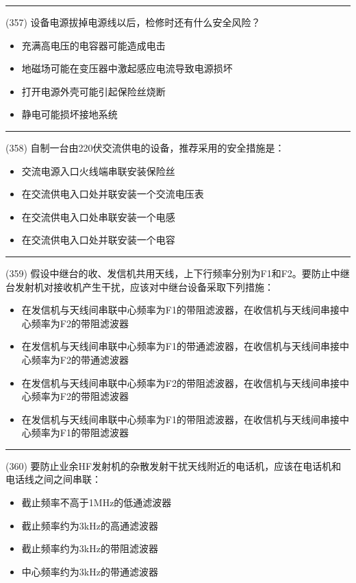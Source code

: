 \documentclass[twocolumn]{ctexart}  %
\begin{document}
\noindent\rule{0.5\textwidth}{1pt}
\heiti (357) 设备电源拔掉电源线以后，检修时还有什么安全风险？ \songti {\color{gray} [LK1233] }
\begin{itemize}
	\item  充满高电压的电容器可能造成电击
	\item  地磁场可能在变压器中激起感应电流导致电源损坏
	\item  打开电源外壳可能引起保险丝烧断
	\item  静电可能损坏接地系统
\end{itemize}


\noindent\rule{0.5\textwidth}{1pt}
\heiti (358) 自制一台由220伏交流供电的设备，推荐采用的安全措施是： \songti {\color{gray} [LK1234] }
\begin{itemize}
	\item  交流电源入口火线端串联安装保险丝
	\item  在交流供电入口处并联安装一个交流电压表
	\item  在交流供电入口处串联安装一个电感
	\item  在交流供电入口处并联安装一个电容
\end{itemize}


\noindent\rule{0.5\textwidth}{1pt}
\heiti (359) 假设中继台的收、发信机共用天线，上下行频率分别为F1和F2。要防止中继台发射机对接收机产生干扰，应该对中继台设备采取下列措施： \songti {\color{gray} [LK0574] }
\begin{itemize}
	\item  在发信机与天线间串联中心频率为F1的带阻滤波器，在收信机与天线间串接中心频率为F2的带阻滤波器
	\item  在发信机与天线间串联中心频率为F1的带通滤波器，在收信机与天线间串接中心频率为F2的带通滤波器
	\item  在发信机与天线间串联中心频率为F2的带阻滤波器，在收信机与天线间串接中心频率为F2的带阻滤波器
	\item  在发信机与天线间串联中心频率为F1的带阻滤波器，在收信机与天线间串接中心频率为F1的带阻滤波器
\end{itemize}


\noindent\rule{0.5\textwidth}{1pt}
\heiti (360) 要防止业余HF发射机的杂散发射干扰天线附近的电话机，应该在电话机和电话线之间之间串联： \songti {\color{gray} [LK0575] }
\begin{itemize}
	\item  截止频率不高于1MHz的低通滤波器
	\item  截止频率约为3kHz的高通滤波器
	\item  截止频率约为3kHz的带阻滤波器
	\item  中心频率约为3kHz的带通滤波器
\end{itemize}
\end{document}
